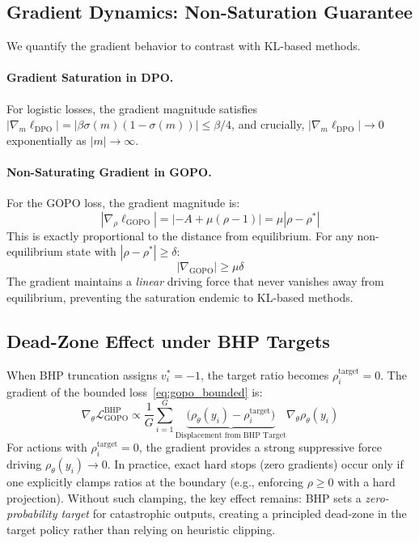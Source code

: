 \documentclass[11pt]{article}
\theoremstyle{definition}
\theoremstyle{remark}
\newcommand{\loss}{\mathcal{L}}
\begin{document}
\subsection{Gradient Dynamics: Non-Saturation Guarantee}
\label{subsec:gradient}

We quantify the gradient behavior to contrast with KL-based methods.

\paragraph{Gradient Saturation in DPO.}
For logistic losses, the gradient magnitude satisfies $|\nabla_m \ell_{\text{DPO}}| = |\beta\sigma(m)(1-\sigma(m))| \leq \beta/4$, and crucially, $|\nabla_m \ell_{\text{DPO}}| \to 0$ exponentially as $|m| \to \infty$.

\paragraph{Non-Saturating Gradient in GOPO.}
For the GOPO loss, the gradient magnitude is:
\begin{equation}
    |\nabla_\rho \ell_{\text{GOPO}}| = |{-A + \mu(\rho - 1)}| = \mu|\rho - \rho^*|
\end{equation}
This is exactly proportional to the distance from equilibrium. For any non-equilibrium state with $|\rho - \rho^*| \geq \delta$:
\begin{equation}
    |\nabla_{\text{GOPO}}| \geq \mu\delta
\end{equation}
The gradient maintains a \emph{linear} driving force that never vanishes away from equilibrium, preventing the saturation endemic to KL-based methods.

\subsection{Dead-Zone Effect under BHP Targets}
\label{subsec:dead_zone}

When BHP truncation assigns $v_i^* = -1$, the target ratio becomes $\rho_i^{\text{target}} = 0$. The gradient of the bounded loss~\eqref{eq:gopo_bounded} is:
\begin{equation}
\label{eq:dead_zone_grad}
    \nabla_\theta \loss_{\text{GOPO}}^{\text{BHP}} \propto \frac{1}{G}\sum_{i=1}^G \underbrace{\big(\rho_\theta(y_i) - \rho_i^{\text{target}}\big)}_{\text{Displacement from BHP Target}} \nabla_\theta \rho_\theta(y_i)
\end{equation}
For actions with $\rho_i^{\text{target}} = 0$, the gradient provides a strong suppressive force driving $\rho_\theta(y_i) \to 0$. In practice, exact hard stops (zero gradients) occur only if one explicitly clamps ratios at the boundary (e.g., enforcing $\rho \geq 0$ with a hard projection). Without such clamping, the key effect remains: BHP sets a \emph{zero-probability target} for catastrophic outputs, creating a principled dead-zone in the target policy rather than relying on heuristic clipping.
\end{document}
